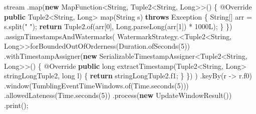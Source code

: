 \documentclass[cn,11pt,chinese]{elegantbook}
\newenvironment{Shaded}{}{}
\newcommand{\AttributeTok}[1]{\textcolor[rgb]{0.49,0.56,0.16}{#1}}
\newcommand{\BuiltInTok}[1]{#1}
\newcommand{\DataTypeTok}[1]{\textcolor[rgb]{0.56,0.13,0.00}{#1}}
\newcommand{\DecValTok}[1]{\textcolor[rgb]{0.25,0.63,0.44}{#1}}
\newcommand{\FunctionTok}[1]{\textcolor[rgb]{0.02,0.16,0.49}{#1}}
\newcommand{\KeywordTok}[1]{\textcolor[rgb]{0.00,0.44,0.13}{\textbf{#1}}}
\newcommand{\NormalTok}[1]{#1}
\newcommand{\StringTok}[1]{\textcolor[rgb]{0.25,0.44,0.63}{#1}}
\begin{document}
\begin{Shaded}
\begin{Highlighting}[]
\NormalTok{        stream}
\NormalTok{            .}\FunctionTok{map}\NormalTok{(}\KeywordTok{new}\NormalTok{ MapFunction\textless{}}\BuiltInTok{String}\NormalTok{, Tuple2\textless{}}\BuiltInTok{String}\NormalTok{, }\BuiltInTok{Long}\NormalTok{\textgreater{}\textgreater{}() \{}
                \AttributeTok{@Override}
                \KeywordTok{public}\NormalTok{ Tuple2\textless{}}\BuiltInTok{String}\NormalTok{, }\BuiltInTok{Long}\NormalTok{\textgreater{} }\FunctionTok{map}\NormalTok{(}\BuiltInTok{String}\NormalTok{ s) }\KeywordTok{throws} \BuiltInTok{Exception}\NormalTok{ \{}
                    \BuiltInTok{String}\NormalTok{[] arr = s.}\FunctionTok{split}\NormalTok{(}\StringTok{" "}\NormalTok{);}
                    \KeywordTok{return}\NormalTok{ Tuple2.}\FunctionTok{of}\NormalTok{(arr[}\DecValTok{0}\NormalTok{], }\BuiltInTok{Long}\NormalTok{.}\FunctionTok{parseLong}\NormalTok{(arr[}\DecValTok{1}\NormalTok{]) * }\DecValTok{1000L}\NormalTok{);}
\NormalTok{                \}}
\NormalTok{            \})}
\NormalTok{            .}\FunctionTok{assignTimestampsAndWatermarks}\NormalTok{(}
\NormalTok{                WatermarkStrategy.\textless{}Tuple2\textless{}}\BuiltInTok{String}\NormalTok{, }\BuiltInTok{Long}\NormalTok{\textgreater{}\textgreater{}}\FunctionTok{forBoundedOutOfOrderness}\NormalTok{(}\BuiltInTok{Duration}\NormalTok{.}\FunctionTok{ofSeconds}\NormalTok{(}\DecValTok{5}\NormalTok{))}
\NormalTok{                .}\FunctionTok{withTimestampAssigner}\NormalTok{(}\KeywordTok{new}\NormalTok{ SerializableTimestampAssigner\textless{}Tuple2\textless{}}\BuiltInTok{String}\NormalTok{, }\BuiltInTok{Long}\NormalTok{\textgreater{}\textgreater{}() \{}
                    \AttributeTok{@Override}
                    \KeywordTok{public} \DataTypeTok{long} \FunctionTok{extractTimestamp}\NormalTok{(Tuple2\textless{}}\BuiltInTok{String}\NormalTok{, }\BuiltInTok{Long}\NormalTok{\textgreater{} stringLongTuple2, }\DataTypeTok{long}\NormalTok{ l) \{}
                        \KeywordTok{return}\NormalTok{ stringLongTuple2.}\FunctionTok{f1}\NormalTok{;}
\NormalTok{                    \}}
\NormalTok{                \})}
\NormalTok{            )}
\NormalTok{            .}\FunctionTok{keyBy}\NormalTok{(r {-}\textgreater{} r.}\FunctionTok{f0}\NormalTok{)}
\NormalTok{            .}\FunctionTok{window}\NormalTok{(TumblingEventTimeWindows.}\FunctionTok{of}\NormalTok{(}\BuiltInTok{Time}\NormalTok{.}\FunctionTok{seconds}\NormalTok{(}\DecValTok{5}\NormalTok{)))}
\NormalTok{            .}\FunctionTok{allowedLateness}\NormalTok{(}\BuiltInTok{Time}\NormalTok{.}\FunctionTok{seconds}\NormalTok{(}\DecValTok{5}\NormalTok{))}
\NormalTok{            .}\FunctionTok{process}\NormalTok{(}\KeywordTok{new} \FunctionTok{UpdateWindowResult}\NormalTok{())}
\NormalTok{            .}\FunctionTok{print}\NormalTok{();}


\end{Highlighting}
\end{Shaded}
\end{document}

